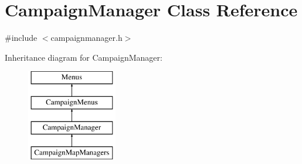 \hypertarget{class_campaign_manager}{}\section{Campaign\+Manager Class Reference}
\label{class_campaign_manager}


{\ttfamily \#include $<$campaignmanager.\+h$>$}

Inheritance diagram for Campaign\+Manager\+:\begin{figure}[H]
\begin{center}
\leavevmode
\includegraphics[height=4.000000cm]{class_campaign_manager}
\end{center}
\end{figure}
